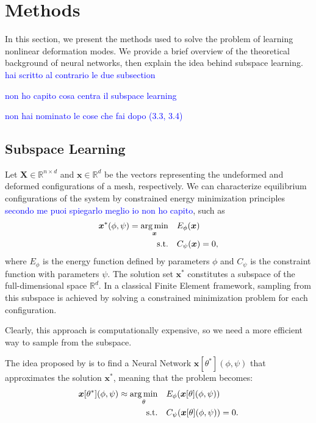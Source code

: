 \section{Methods}
\label{sec:methods}

In this section, we present the methods used to solve the problem of learning nonlinear deformation modes. We provide a brief overview of the theoretical background of neural networks, then explain the idea behind subspace learning. \textcolor{blue}{hai scritto al contrario le due subsection}

\textcolor{blue}{non ho capito cosa centra il subspace learning}

\textcolor{blue}{non hai nominato le cose che fai dopo (3.3, 3.4)}

\subsection{Subspace Learning}

Let \( \bm{X} \in \mathbb{R}^{n \times d} \) and \( \bm{x} \in \mathbb{R}^{d} \) be the vectors representing the undeformed and deformed configurations of a mesh, respectively. We can characterize equilibrium configurations of the system by constrained energy minimization principles \textcolor{blue}{secondo me puoi spiegarlo meglio io non ho capito}, such as 
\begin{align*}
    \bm{x}^*(\phi, \psi) = \underset{\bm{x}}{\operatorname*{arg\,min}} \quad & E_\phi(\bm{x}) \\
    \text{s.t.} \quad & C_\psi(\bm{x}) = 0,
\end{align*}
where \( E_\phi \) is the energy function defined by parameters \(\phi\) and \( C_\psi \) is the constraint function with parameters \(\psi\). The solution set \( \bm{x}^*\) constitutes a subspace of the full-dimensional space \( \mathbb{R}^d \). In a classical Finite Element framework, sampling from this subspace is achieved by solving a constrained minimization problem for each configuration. 

Clearly, this approach is computationally expensive, so we need a more efficient way to sample from the subspace.

The idea proposed by \cite{Wang_Du_Coros_Thomaszewski_2024} is to find a Neural Network \( \bm{x}[\theta^*](\phi, \psi) \) that approximates the solution \( \bm{x}^* \), meaning that the problem becomes:
\begin{align*}
    \bm{x}[\theta^*](\phi, \psi) \approx \underset{\theta}{\operatorname*{arg\,min}} \quad & E_\phi(\bm{x}[\theta](\phi, \psi)) \\
    \text{s.t.} \quad & C_\psi(\bm{x}[\theta](\phi, \psi)) = 0.
\end{align*}

